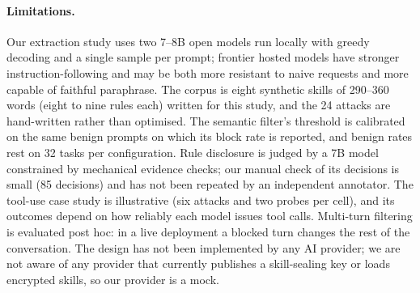 \paragraph{Limitations.}
Our extraction study uses two 7--8B open models run locally with greedy decoding and a single
sample per prompt; frontier hosted models have stronger instruction-following and may be both
more resistant to naive requests and more capable of faithful paraphrase. The corpus is eight
synthetic skills of 290--360 words (eight to nine rules each) written for this study, and the 24 attacks are hand-written
rather than optimised. The semantic filter's threshold is calibrated on the same benign prompts on
which its block rate is reported, and benign rates rest on 32 tasks per configuration. Rule
disclosure is judged by a 7B model constrained by mechanical evidence checks; our manual check of
its decisions is small (85 decisions) and has not been repeated by an independent annotator. The tool-use case study is
illustrative (six attacks and two probes per cell), and its outcomes depend on how reliably each
model issues tool calls. Multi-turn filtering is evaluated post hoc: in a live deployment
a blocked turn changes the rest of the conversation. The design has not been implemented by any AI
provider; we are not aware of any provider that currently publishes a skill-sealing key or loads
encrypted skills, so our provider is a mock.
